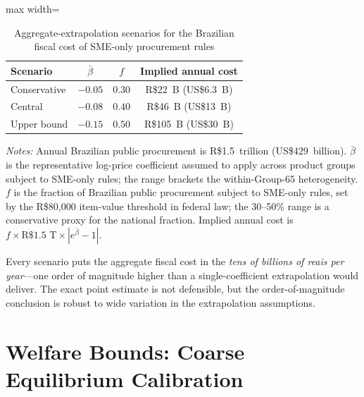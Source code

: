 \documentclass[12pt]{article}
\begin{document}
\begin{table}[htbp]
\centering
\caption{Aggregate-extrapolation scenarios for the Brazilian fiscal cost of SME-only procurement rules}
\label{tab:aggregate_bounds}
\begin{adjustbox}{max width=\textwidth}
\begin{threeparttable}
\small
\begin{tabular}{lccc}
\toprule
Scenario & $\bar\beta$ & $f$ & Implied annual cost \\
\midrule
Conservative & $-0.05$ & $0.30$ & R\$22~B (US\$6.3~B) \\
Central      & $-0.08$ & $0.40$ & R\$46~B (US\$13~B)  \\
Upper bound  & $-0.15$ & $0.50$ & R\$105~B (US\$30~B) \\
\bottomrule
\end{tabular}
\begin{tablenotes}
\small
\item \textit{Notes:} Annual Brazilian public procurement is R\$1.5~trillion (US\$429~billion). $\bar\beta$ is the representative log-price coefficient assumed to apply across product groups subject to SME-only rules; the range brackets the within-Group-65 heterogeneity. $f$ is the fraction of Brazilian public procurement subject to SME-only rules, set by the R\$80{,}000 item-value threshold in federal law; the 30--50\% range is a conservative proxy for the national fraction. Implied annual cost is $f \times \text{R\$1.5~T} \times |e^{\bar\beta} - 1|$.
\end{tablenotes}
\end{threeparttable}
\end{adjustbox}
\end{table}

Every scenario puts the aggregate fiscal cost in the \emph{tens of billions of reais per year}---one order of magnitude higher than a single-coefficient extrapolation would deliver. The exact point estimate is not defensible, but the order-of-magnitude conclusion is robust to wide variation in the extrapolation assumptions.

\clearpage

\section{Welfare Bounds: Coarse Equilibrium Calibration}
\label{oa:welfare}
\end{document}
